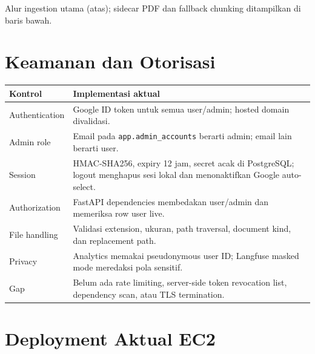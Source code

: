 \documentclass[11pt,a4paper]{article}
\newcommand{\landscapefooter}{%
  \noindent\makebox[\linewidth]{\small\color{Muted}HR Assistant\hfill\thepage}%
}
\begin{document}
\begin{landscape}
\begin{center}
{%
}
\end{center}
\begin{center}\small\color{Muted}Alur ingestion utama (atas); sidecar PDF dan fallback chunking ditampilkan di baris bawah.\end{center}
\vfill
\landscapefooter
\end{landscape}

\newpage
\section{Keamanan dan Otorisasi}
\begin{tabularx}{\linewidth}{@{}p{4.4cm}X@{}}
\toprule \textbf{Kontrol} & \textbf{Implementasi aktual} \\ \midrule
Authentication & Google ID token untuk semua user/admin; hosted domain divalidasi. \\
Admin role & Email pada \texttt{app.admin\_accounts} berarti admin; email lain berarti user. \\
Session & HMAC-SHA256, expiry 12 jam, secret acak di PostgreSQL; logout menghapus sesi lokal dan menonaktifkan Google auto-select. \\
Authorization & FastAPI dependencies membedakan user/admin dan memeriksa row user live. \\
File handling & Validasi extension, ukuran, path traversal, document kind, dan replacement path. \\
Privacy & Analytics memakai pseudonymous user ID; Langfuse masked mode meredaksi pola sensitif. \\
Gap & Belum ada rate limiting, server-side token revocation list, dependency scan, atau TLS termination. \\
\bottomrule
\end{tabularx}



\newpage
\section{Deployment Aktual EC2}
\end{document}
